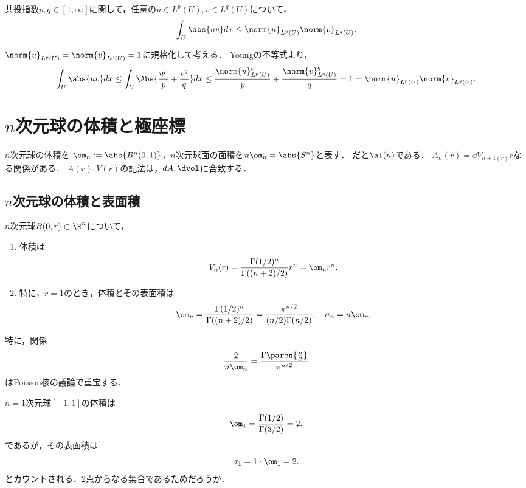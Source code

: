 \documentclass[uplatex,dvipdfmx]{jsreport}
\begin{document}
\begin{corollary}[Hölderの不等式]
    共役指数$p,q\in[1,\infty]$に関して，任意の$u\in L^p(U),v\in L^q(U)$について，
    \[\int_U\abs{uv}dx\le\norm{u}_{L^p(U)}\norm{v}_{L^q(U)}.\]
\end{corollary}
\begin{Proof}
    $\norm{u}_{L^p(U)}=\norm{v}_{L^p(U)}=1$に規格化して考える．
    Youngの不等式より，
    \[\int_U\abs{uv}dx\le\int_U\Abs{\frac{u^p}{p}+\frac{v^q}{q}}dx\le \frac{\norm{u}_{L^p(U)}^p}{p}+\frac{\norm{v}_{L^q(U)}^q}{q}=1=\norm{u}_{L^p(U)}\norm{v}_{L^q(U)}.\]
\end{Proof}

\section{$n$次元球の体積と極座標}

\begin{tcolorbox}[colframe=ForestGreen, colback=ForestGreen!10!white,breakable,colbacktitle=ForestGreen!40!white,coltitle=black,fonttitle=\bfseries\sffamily,
title=]
    $n$次元球の体積を
    $\om_n:=\abs{B^n(0,1)}$，$n$次元球面の面積を$n\om_n=\abs{S^n}$と表す．
    \cite{Evans}だと$\al(n)$である．
    $A_n(r)=\dd{V_{n+1(r)}}{r}$なる関係がある．
    $A(r),V(r)$の記法は，$dA,\dvol$に合致する．
\end{tcolorbox}

\subsection{$n$次元球の体積と表面積}

\begin{theorem}[球の体積]
    $n$次元球$B(0,r)\subset\R^n$について，
    \begin{enumerate}
        \item 体積は
        \[V_n(r)=\frac{\Gamma(1/2)^n}{\Gamma((n+2)/2)}r^n=\om_nr^n.\]
        \item 特に，$r=1$のとき，体積とその表面積は
        \[\om_n=\frac{\Gamma(1/2)^n}{\Gamma((n+2)/2)}=\frac{\pi^{n/2}}{(n/2)\Gamma(n/2)},\quad\sigma_n=n\om_n.\]
    \end{enumerate}
    特に，関係
    \[\frac{2}{n\om_n}=\frac{\Gamma\paren{\frac{n}{2}}}{\pi^{n/2}}\]
    はPoisson核の議論で重宝する．
\end{theorem}
\begin{remark}
    $n=1$次元球$[-1,1]$の体積は
    \[\om_1=\frac{\Gamma(1/2)}{\Gamma(3/2)}=2.\]
    であるが，その表面積は
    \[\sigma_1=1\cdot\om_1=2.\]
    とカウントされる．2点からなる集合であるためだろうか．
\end{remark}
\end{document}
